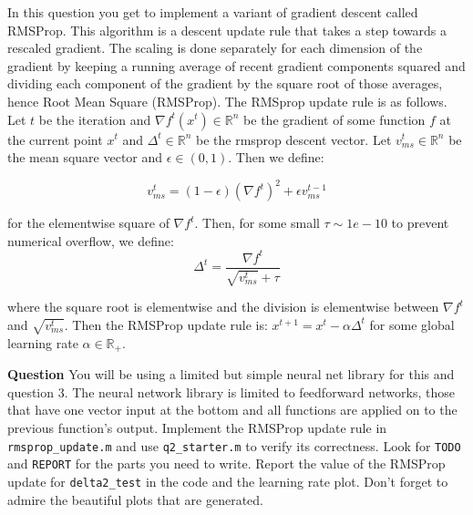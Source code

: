 \documentclass{article}
\begin{document}
In this question you get to implement a variant of gradient descent called RMSProp.
This algorithm is a descent update rule that takes a step towards a rescaled gradient.
The scaling is done separately for each dimension of the gradient by keeping a running average
of recent gradient components squared and dividing each component of the gradient by the square root of 
those averages, hence Root Mean Square (RMSProp).
The RMSprop update rule is as follows.  
Let $t$ be the iteration and $\nabla f^t(x^t) \in \mathbb{R}^n$ be the gradient of some function $f$ at the current point $x^t$ and $\Delta^t \in \mathbb{R}^n$ 
be the rmsprop descent vector.
Let $v_{ms}^t \in \mathbb{R}^n$ be the mean square vector and $\epsilon \in (0, 1)$.
Then we define:

\[
    v_{ms}^{t} = (1 - \epsilon) (\nabla f^t)^2 + \epsilon v_{ms}^{t - 1}
\]

for the elementwise square of $\nabla f ^t$.
Then, for some small $\tau \sim 1e-10$ to prevent numerical overflow, we define:
\[
    \Delta^t = \frac{\nabla f^t} {\sqrt{v_{ms}^t} + \tau}
\]

where the square root is elementwise and the division is elementwise between $\nabla f^t$ and $\sqrt{v_{ms}^t}$.
Then the RMSProp update rule is:
$x^{t+1} = x^t - \alpha \Delta^t$ for some global learning rate $\alpha \in \mathbb{R}_+$.

{\bf Question} You will be using a limited but simple neural net library for this and question 3.
The neural network library is limited to feedforward networks, those that have one vector
input at the bottom and all functions are applied on to the previous function's output.
Implement the RMSProp update rule in \verb|rmsprop_update.m| and use \verb|q2_starter.m| to verify its correctness.
Look for \verb|TODO| and \verb|REPORT| for the parts you need to write.
Report the value of the RMSProp update for \verb|delta2_test| in the code and the learning rate plot.
Don't forget to admire the beautiful plots that are generated.
\\


\end{document}

